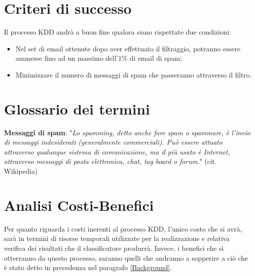 \section{Criteri di successo}
	Il processo KDD andrà a buon fine qualora siano rispettate due condizioni:
	\begin{itemize}
		\item 	Nel set di email ottenute dopo aver effettuato il filtraggio, potranno essere ammesse fino ad un massimo dell'1\% di email di spam;
		\item	Minimizzare il numero di messaggi di spam che passeranno attraverso il filtro.
	\end{itemize}

\section{Glossario dei termini}
\textbf{Messaggi di spam}: "\textit{Lo spamming, detto anche fare spam o spammare, è l'invio di messaggi indesiderati (generalmente commerciali). Può essere attuato attraverso qualunque sistema di comunicazione, ma il più usato è Internet, attraverso messaggi di posta elettronica, chat, tag board o forum.}" (cit. Wikipedia)\cite{wiki:Spam}

\section{Analisi Costi-Benefici}
Per quanto riguarda i costi inerenti al processo KDD, l'unico costo che si avrà, sarà in termini di risorse temporali utilizzate per la realizzazione e relativa verifica dei risultati che il classificatore produrrà.
Invece, i benefici che si otterranno da questo processo, saranno quelli che andranno a sopperire a ciò che è stato detto in precedenza nel paragrafo \ref{Background}.

